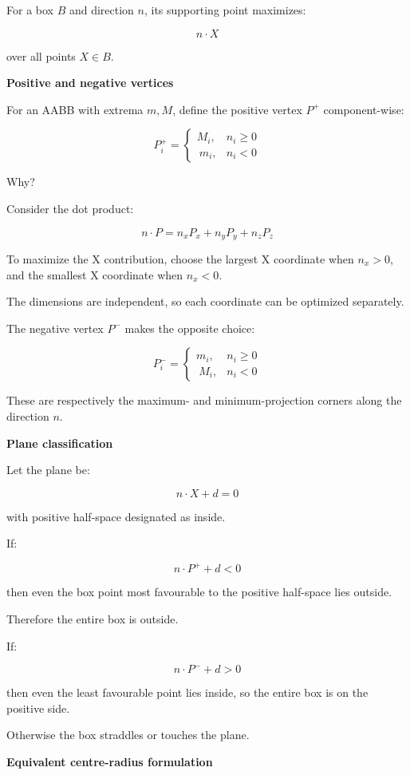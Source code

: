 For a box \(B\) and direction \(n\), its supporting point maximizes:

\[
n\cdot X
\]

over all points \(X\in B\).

\textbf{Positive and negative vertices}

For an AABB with extrema \(m,M\), define the positive vertex \(P^+\) component-wise:

\[
\boxed{ P_i^+= \begin{cases} M_i,&n_i\ge0\\\ m_i,&n_i<0 \end{cases} }
\]

Why?

Consider the dot product:

\[
n\cdot P=n_xP_x+n_yP_y+n_zP_z
\]

To maximize the X contribution, choose the largest X coordinate when \(n_x>0\), and the smallest X coordinate when \(n_x<0\).

The dimensions are independent, so each coordinate can be optimized separately.

The negative vertex \(P^-\) makes the opposite choice:

\[
\boxed{ P_i^-= \begin{cases} m_i,&n_i\ge0\\\ M_i,&n_i<0 \end{cases} }
\]

These are respectively the maximum- and minimum-projection corners along the direction \(n\).

\textbf{Plane classification}

Let the plane be:

\[
n\cdot X+d=0
\]

with positive half-space designated as inside.

If:

\[
n\cdot P^++d<0
\]

then even the box point most favourable to the positive half-space lies outside.

Therefore the entire box is outside.

If:

\[
n\cdot P^-+d>0
\]

then even the least favourable point lies inside, so the entire box is on the positive side.

Otherwise the box straddles or touches the plane.

\textbf{Equivalent centre-radius formulation}

